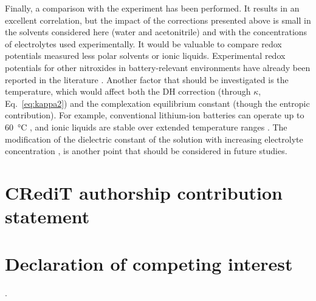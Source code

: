 \documentclass[review,preprint]{elsarticle}
\begin{document}
Finally, a comparison with the experiment has been performed. It results in an excellent correlation, but the impact of the corrections presented above is small in the solvents considered here (water and acetonitrile) and with the concentrations of electrolytes used experimentally. It would be valuable to compare redox potentials measured  less polar solvents or ionic liquids. Experimental redox potentials for other nitroxides in battery-relevant environments have already been reported in the literature \cite{bergnerTEMPOMobileCatalyst2014,tkachevaTEMPOIonicLiquidsRedox2020}. Another factor that should be investigated is the temperature, which would affect both the DH correction (through $\kappa$, Eq.~\eqref{eq:kappa2}) and the complexation equilibrium constant (though the entropic contribution). For example, conventional lithium-ion batteries can operate up to \SI{60}{\degreeCelsius} \cite{maTemperatureEffectThermal2018}, and ionic liquids are stable over extended temperature ranges \cite{tkachevaTEMPOIonicLiquidsRedox2020}. The modification of the dielectric constant of the solution with increasing electrolyte concentration \cite{kontogeorgisDebyeHuckelTheoryIts2018, silvaTrueHuckelEquation2022}, is another point that should be considered in future studies.

\section*{CRediT authorship contribution statement}

	
\section*{Declaration of competing interest}

.
\end{document}
